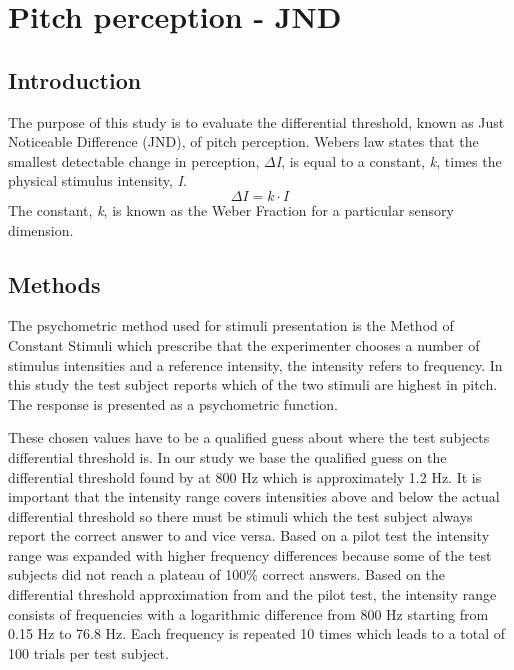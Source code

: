 \chapter*{Pitch perception - JND}

\section*{Introduction}
%
The purpose of this study is to evaluate the differential threshold, known as Just Noticeable Difference (JND), of pitch perception. Webers law states that the smallest detectable change in perception, \textit{$\Delta$I}, is equal to a constant, \textit{k}, times the physical stimulus intensity, \textit{I}. 
%
\begin{equation}
\Delta I = k \cdot I
\end{equation}
%
The constant, \textit{k}, is known as the Weber Fraction for a particular sensory dimension.
%

\section*{Methods}
%
The psychometric method used for stimuli presentation is the Method of Constant Stimuli which prescribe that the experimenter chooses a number of stimulus intensities and a reference intensity, the intensity refers to frequency. In this study the test subject reports which of the two stimuli are highest in pitch. The response is presented as a psychometric function. 

These chosen values have to be a qualified guess about where the test subjects differential threshold is. In our study we base the qualified guess on the differential threshold found by \citep{Wier1977} at 800 Hz which is approximately 1.2 Hz. It is important that the intensity range covers intensities above and below the actual differential threshold so there must be stimuli which the test subject always report the correct answer to and vice versa. Based on a pilot test the intensity range was expanded with higher frequency differences because some of the test subjects did not reach a plateau of 100\% correct answers. Based on the differential threshold approximation from \citep{Wier1977} and the pilot test, the intensity range consists of frequencies with a logarithmic difference from 800 Hz starting from 0.15 Hz to 76.8 Hz. Each frequency is repeated 10 times which leads to a total of 100 trials per test subject.  

